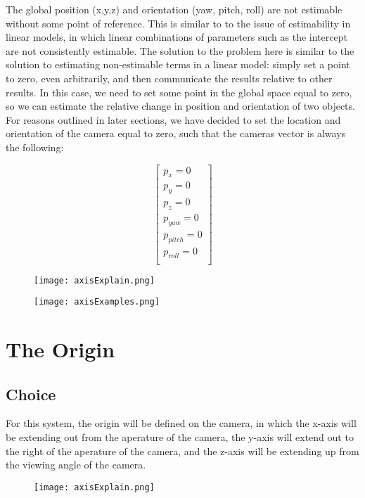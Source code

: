 \documentclass{article}
\begin{document}
The global position (x,y,z) and orientation (yaw, pitch, roll) are not estimable without some point of reference. This is similar to to the issue of estimability in linear models, in which linear combinations of parameters such as the intercept are not consistently estimable. The solution to the problem here is similar to the solution to estimating non-estimable terms in a linear model: simply set a point to zero, even arbitrarily, and then communicate the results relative to other results. In this case, we need to set some point in the global space equal to zero, so we can estimate the relative change in position and orientation of two objects. For reasons outlined in later sections, we have decided to set the location and orientation of the camera equal to zero, such that the cameras vector is always the following:

\[
\begin{bmatrix}
    p_{x}=0 \\
    p_{y}=0 \\
    p_{z}=0 \\
    p_{yaw}=0 \\
    p_{pitch}=0 \\
    p_{roll}=0 \\
\end{bmatrix}
\]



\begin{figure}[H]
    \centering
    \texttt{[image: axisExplain.png]}
   \label{fig:compute}
    \caption{}
\end{figure}

\begin{figure}[H]
    \centering
    \texttt{[image: axisExamples.png]}
   \label{fig:compute}
    \caption{}
\end{figure}



\section{The Origin}
\subsection{Choice}
For this system, the origin will be defined on the camera, in which the x-axis will be extending out from the aperature of the camera, the y-axis will extend out to the right of the aperature of the camera, and the z-axis will be extending up from the viewing angle of the camera.
\begin{figure}[H]
    \centering
    \texttt{[image: axisExplain.png]}
   \label{fig:compute}
    \caption{}
\end{figure}
\end{document}
